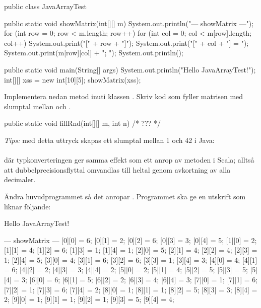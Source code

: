 \begin{Code}[language=Java]
public class JavaArrayTest {

    public static void showMatrix(int[][] m){
        System.out.println("\n--- showMatrix ---");
        for (int row = 0; row < m.length; row++){
            for (int col = 0; col < m[row].length; col++) {
                System.out.print("[" + row + "]");
                System.out.print("[" + col + "] = ");
                System.out.print(m[row][col] + "; ");
            }
            System.out.println();
        }
    }

    public static void main(String[] args) {
        System.out.println("Hello JavaArrayTest!");
        int[][] xss = new int[10][5];
        showMatrix(xss);
    }
}
\end{Code}

\Subtask Implementera nedan metod  inuti klassen . Skriv kod som fyller matrisen  med slumptal mellan  och .
\begin{Code}[language=Java]
    public static void fillRnd(int[][] m, int n){
        /* ??? */
    }
\end{Code}
\noindent \emph{Tips:} med detta uttryck skapas ett slumptal mellan 1 och 42 i Java:\\
 \\
där typkonverteringen  ger samma effekt som ett anrop av metoden  i Scala; alltså att dubbelprecisionsflyttal omvandlas till heltal genom avkortning av alla decimaler.


Ändra huvudprogrammet så det anropar . %
Programmet ska ge en utskrift som liknar följande:
\begin{REPL}
Hello JavaArrayTest!

--- showMatrix ---
[0][0] = 6; [0][1] = 2; [0][2] = 6; [0][3] = 3; [0][4] = 5;
[1][0] = 2; [1][1] = 4; [1][2] = 6; [1][3] = 1; [1][4] = 1;
[2][0] = 5; [2][1] = 4; [2][2] = 4; [2][3] = 1; [2][4] = 5;
[3][0] = 4; [3][1] = 6; [3][2] = 6; [3][3] = 1; [3][4] = 3;
[4][0] = 4; [4][1] = 6; [4][2] = 2; [4][3] = 3; [4][4] = 2;
[5][0] = 2; [5][1] = 4; [5][2] = 5; [5][3] = 5; [5][4] = 3;
[6][0] = 6; [6][1] = 5; [6][2] = 2; [6][3] = 4; [6][4] = 3;
[7][0] = 1; [7][1] = 6; [7][2] = 1; [7][3] = 6; [7][4] = 2;
[8][0] = 1; [8][1] = 1; [8][2] = 5; [8][3] = 3; [8][4] = 2;
[9][0] = 1; [9][1] = 1; [9][2] = 1; [9][3] = 5; [9][4] = 4;

\end{REPL}


